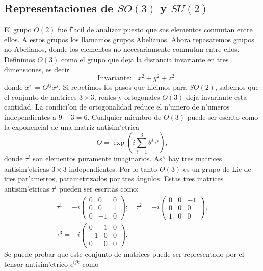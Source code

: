 \subsection{Representaciones de $SO(3)$ y $SU(2)$} 
El grupo $O(2)$ fue f'acil de analizar puesto que sus elementos conmutan entre ellos. A estos grupos los llamamos grupos Abelianos. Ahora repasaremos grupos no-Abelianos, donde los elementos no necesariamente conmutan entre ellos. Definimos $O(3)$ como el grupo que deja la distancia invariante en tres dimensiones, es decir
\begin{equation}
\quad \text{Invariante:}\,\,\,\,\,  x^2+y^2+z^2
\end{equation}
donde $x^{i\prime}=O^{ij}x^j$. Si repetimos los pasos que hicimos para $SO(2)$, sabemos que el conjunto de matrices $3\times 3$, reales y ortogonales $O(3)$ deja invariante esta cantidad. La condici'on de ortogonalidad reduce el n'umero de n'umeros independientes a $9-3=6$. Cualquier miembro de $O(3)$ puede ser escrito como la exponencial de una matriz antisim'etrica
\begin{equation}
O=\exp \left({i\sum_{i=1}^{3}\theta^i \tau^i}\right),
\end{equation}
donde $\tau^i$ son elementos puramente imaginarios. As'i hay tres matrices antisim'etricas $3\times 3$ independientes. Por lo tanto $O(3)$ es un grupo de Lie de tres par'ametros, parametrizados por tres ángulos.
Estas tres matrices antisim'etricas $\tau^i$ pueden ser escritas como:
\begin{equation}
\begin{aligned}
\tau^{1}=-i\begin{pmatrix}0 & 0 & 0\\
0 & 0 & 1\\
0 & -1 & 0
\end{pmatrix};\,\,\,\,\,\,\tau^{2}=-i\begin{pmatrix}0 & 0 & -1\\
0 & 0 & 0\\
1 & 0 & 0
\end{pmatrix}, \\
\tau^{3}=-i\begin{pmatrix}0 & 1 & 0\\
-1 & 0 & 0\\
0 & 0 & 0
\end{pmatrix}.
\end{aligned}
\end{equation}
Se puede probar que este conjunto de matrices puede ser representado por el tensor antisim'etrico $\epsilon^{ijk}$ como

